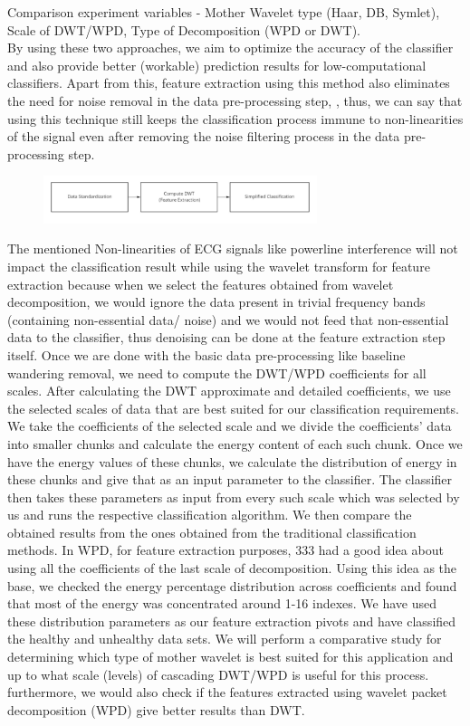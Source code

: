 \documentclass[10pt,twocolumn,letterpaper]{article}
\begin{document}
\cite{Alpher01,Alpher02,Alpher03,Alpher04, Alpher05}
Comparison experiment variables - Mother Wavelet type (Haar, DB, Symlet), Scale of DWT/WPD, Type of Decomposition (WPD or DWT).\\
By using these two approaches, we aim to optimize the accuracy of the classifier and also provide better (workable) prediction results for low-computational classifiers. Apart from this, feature extraction using this method also eliminates the need for noise removal in the data pre-processing step, , thus, we can say that using this technique still keeps the classification process immune to non-linearities of the signal even after removing the noise filtering process in the data pre-processing step.
\begin{figure}[htbp]
\includegraphics[width=8cm]{proposed.png}
\end{figure}

The mentioned Non-linearities of ECG signals like powerline interference will not impact the classification result while using the wavelet transform for feature extraction because when we select the features obtained from wavelet decomposition, we would ignore the data present in trivial frequency bands (containing non-essential data/ noise) and we would not feed that non-essential data to the classifier, thus denoising can be done at the feature extraction step itself. 
Once we are done with the basic data pre-processing like baseline wandering removal, we need to compute the DWT/WPD coefficients for all scales. After calculating the DWT approximate and detailed coefficients, we use the selected scales of data that are best suited for our classification requirements. We take the coefficients of the selected scale and we divide the coefficients’ data into smaller chunks and calculate the energy content of each such chunk. Once we have the energy values of these chunks, we calculate the distribution of energy in these chunks and give that as an input parameter to the classifier. The classifier then takes these parameters as input from every such scale which was selected by us and runs the respective classification algorithm. We then compare the obtained results from the ones obtained from the traditional classification methods.
In WPD, for feature extraction purposes, 333 had a good idea about using all the coefficients of the last scale of decomposition. Using this idea as the base, we checked the energy percentage distribution across coefficients and found that most of the energy was concentrated around 1-16 indexes. We have used these distribution parameters as our feature extraction pivots and have classified the healthy and unhealthy data sets.   
We will perform a comparative study for determining which type of mother wavelet is best suited for this application and up to what scale (levels) of cascading DWT/WPD is useful for this process. furthermore, we would also check if the features extracted using wavelet packet decomposition (WPD) give better results than DWT.
\end{document}
